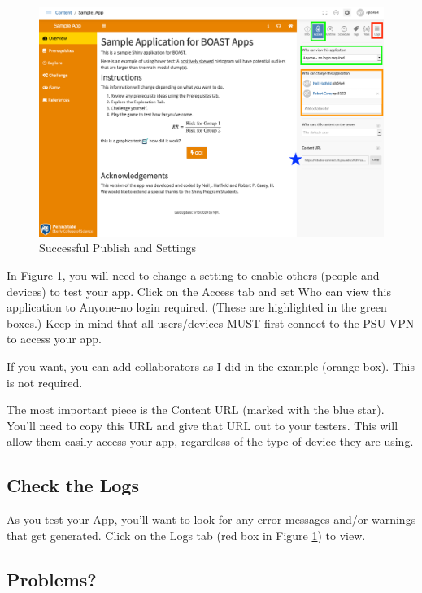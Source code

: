 \documentclass[
]{book}
\begin{document}
\begin{figure}

{\centering \includegraphics[width=18.67in]{images/publish3} 

}

\caption{Successful Publish and Settings}\label{fig:testing3}
\end{figure}

In Figure \ref{fig:testing3}, you will need to change a setting to enable others (people and devices) to test your app. Click on the Access tab and set Who can view this application to Anyone-no login required. (These are highlighted in the green boxes.) Keep in mind that all users/devices MUST first connect to the PSU VPN to access your app.

If you want, you can add collaborators as I did in the example (orange box). This is not required.

The most important piece is the Content URL (marked with the blue star). You'll need to copy this URL and give that URL out to your testers. This will allow them easily access your app, regardless of the type of device they are using.

\hypertarget{check-the-logs}{%
\subsection{Check the Logs}\label{check-the-logs}}

As you test your App, you'll want to look for any error messages and/or warnings that get generated. Click on the Logs tab (red box in Figure \ref{fig:testing3}) to view.

\hypertarget{problems}{%
\subsection{Problems?}\label{problems}}
\end{document}
